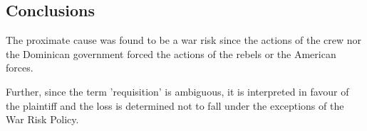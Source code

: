 % 
% 
% 
% 
% 
% 
% 
% 
% 

\subsection{Conclusions}

The proximate cause was found to be a war risk since the actions of the crew nor the Dominican government forced the actions of the rebels or the American forces.

Further, since the term 'requisition' is ambiguous, it is interpreted in favour of the plaintiff and the loss is determined not to fall under the exceptions of the War Risk Policy. 

\FloatBarrier
